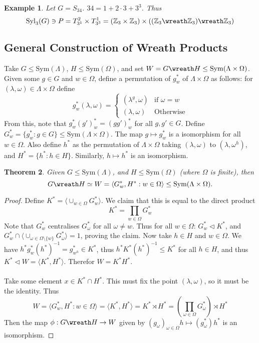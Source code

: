 \documentclass[a4paper,10pt]{article}
\newcommand{\ZZ}{\mathbb{Z}}
\newtheorem{thm}{Theorem}
\newtheorem{eg}[thm]{Example}
\begin{document}
\begin{eg}
Let $G = S_{34}$. $34 = 1 + 2 \cdot 3 + 3^3$. Thus
\[ \text{Syl}_3(G) \ni P = T_{3^1}^2 \times T_{3^3}^1 = (\ZZ_3 \times \ZZ_3) \times (( \ZZ_3 \wreath \ZZ_3) \wreath \ZZ_3) \]
\end{eg}

\subsection{General Construction of Wreath Products}

Take $G \leq \text{Sym}(\Lambda)$, $H \leq \text{Sym}(\Omega)$, and set $W = G \wreath H \leq \text{Sym}( \Lambda \times \Omega)$. Given some $g \in G$ and $w \in \Omega$, define a permutation of $g^*_w$ of $\Lambda \times \Omega$ as follows: for $(\lambda, \omega) \in \Lambda \times \Omega$ define 
\[ g^*_w (\lambda, \omega) = \begin{cases} (\lambda^g, \omega) &\text{if } \omega = w \\ (\lambda, \omega) &\text{Otherwise} \end{cases} \]
From this, note that $g_w^* (g')^*_w = (gg')^*_w$ for all $g, g' \in G$. Define $G^*_w = \{ g^*_w : g \in G \} \leq \text{Sym}(\Lambda \times \Omega)$. The map $g \mapsto g^*_w$ is a isomorphism for all $w \in \Omega$. Also define $h^*$ as the permutation of $\Lambda \times \Omega$ taking $(\lambda, \omega)$ to $(\lambda, \omega^h)$, and $H^* = \{ h^* :  h \in H \}$. Similarly, $h \mapsto h^*$ is an isomorphism.

\begin{thm}
Given $G \leq \text{Sym}(\Lambda)$, and $H \leq \text{Sym}(\Omega)$ (where $\Omega$ is finite), then
\[ G \wreath H \simeq W = \langle G^*_w, H^* : w \in \Omega \rangle \leq \text{Sym}(\Lambda \times \Omega). \]
\end{thm}
\begin{proof}
Define $K^* = \langle \cup_{w \in \Omega} G^*_w \rangle$. We claim that this is equal to the direct product
\[ K^* = \prod_{w \in \Omega} G^*_w \]
Note that $G^*_w$ centralises $G^*_\omega$ for all $\omega \neq w$. Thus for all $w \in \Omega$: $G^*_w \triangleleft K^*$, and $G^*_w \cap \langle \cup_{\omega \in \Omega \setminus \{ w \}} G^*_\omega \rangle = 1$, proving the claim. Now take $h \in H$ and $w \in \Omega$. We have $h^* g^*_w (h^*)^{-1} = g^*_{w^h} \in K^*$, thus $h^* K^* (h^*)^{-1} \leq K^*$ for all $h \in H$, and thus $K^* \triangleleft W = \langle K^*, H^* \rangle$. Therefor $W = K^* H^*$. \\
\\
Take some element $x \in K^* \cap H^*$. This must fix the point $(\lambda, \omega)$, so it must be the identity. Thus
\[ W = \langle G^*_w, H^* : w \in \Omega \rangle = \langle K^*, H^* \rangle = K^* \rtimes H^* = \left( \prod_{\omega \in \Omega} G^*_\omega \right) \rtimes H^*\]
Then the map $\phi : G \wreath H \rightarrow W$ given by $(g_\omega)_{\omega \in \Omega}h \mapsto (g^*_\omega)h^*$ is an isomorphism.
\end{proof}
\end{document}

